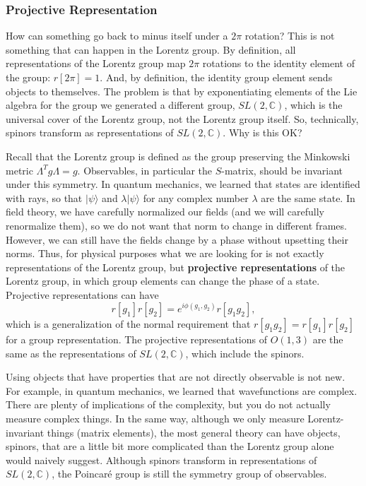 \documentclass[11pt]{article}
\theoremstyle{definition}
\begin{document}
\subsubsection{Projective Representation}
How can something go back to minus itself under a \( 2\pi \) rotation? This is not something that can happen in the Lorentz group. By definition, all representations of the Lorentz group map \( 2\pi \) rotations to the identity element of the group: \( r[2\pi] = 1 \). And, by definition, the identity group element sends objects to themselves. The problem is that by exponentiating elements of the Lie algebra for the group we generated a different group, \( SL(2, \mathbb{C}) \), which is the universal cover of the Lorentz group, not the Lorentz group itself. So, technically, spinors transform as representations of \( SL(2, \mathbb{C}) \). Why is this OK?

Recall that the Lorentz group is defined as the group preserving the Minkowski metric \( \Lambda^T g\Lambda = g \). Observables, in particular the \( S \)-matrix, should be invariant under this symmetry. In quantum mechanics, we learned that states are identified with rays, so that \( |\psi\rangle \) and \( \lambda|\psi\rangle \) for any complex number \( \lambda \) are the same state. In field theory, we have carefully normalized our fields (and we will carefully renormalize them), so we do not want that norm to change in different frames. However, we can still have the fields change by a phase without upsetting their norms. Thus, for physical purposes what we are looking for is not exactly representations of the Lorentz group, but \textbf{projective representations} of the Lorentz group, in which group elements can change the phase of a state. Projective representations can have
\begin{equation}
r[g_1]r[g_2] = e^{i\phi(g_1,g_2)}r[g_1g_2],
\end{equation}
which is a generalization of the normal requirement that \( r[g_1g_2] = r[g_1]r[g_2] \) for a group representation. The projective representations of \( O(1, 3) \) are the same as the representations of \( SL(2, \mathbb{C}) \), which include the spinors.

Using objects that have properties that are not directly observable is not new. For example, in quantum mechanics, we learned that wavefunctions are complex. There are plenty of implications of the complexity, but you do not actually measure complex things. In the same way, although we only measure Lorentz-invariant things (matrix elements), the most general theory can have objects, spinors, that are a little bit more complicated than the Lorentz group alone would naively suggest. Although spinors transform in representations of \( SL(2, \mathbb{C}) \), the Poincaré group is still the symmetry group of observables.
\end{document}
